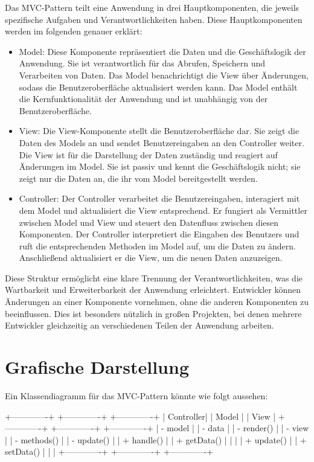 Das MVC-Pattern teilt eine Anwendung in drei Hauptkomponenten, die jeweils spezifische Aufgaben und Verantwortlichkeiten haben. Diese Hauptkomponenten werden im folgenden genauer erklärt:
\begin{itemize}

\item Model: Diese Komponente repräsentiert die Daten und die Geschäftslogik der Anwendung. Sie ist verantwortlich für das Abrufen, Speichern und Verarbeiten von Daten. Das Model benachrichtigt die View über Änderungen, sodass die Benutzeroberfläche aktualisiert werden kann. Das Model enthält die Kernfunktionalität der Anwendung und ist unabhängig von der Benutzeroberfläche.

\item View: Die View-Komponente stellt die Benutzeroberfläche dar. Sie zeigt die Daten des Models an und sendet Benutzereingaben an den Controller weiter. Die View ist für die Darstellung der Daten zuständig und reagiert auf Änderungen im Model. Sie ist passiv und kennt die Geschäftslogik nicht; sie zeigt nur die Daten an, die ihr vom Model bereitgestellt werden.

\item Controller: Der Controller verarbeitet die Benutzereingaben, interagiert mit dem Model und aktualisiert die View entsprechend. Er fungiert als Vermittler zwischen Model und View und steuert den Datenfluss zwischen diesen Komponenten. Der Controller interpretiert die Eingaben des Benutzers und ruft die entsprechenden Methoden im Model auf, um die Daten zu ändern. Anschließend aktualisiert er die View, um die neuen Daten anzuzeigen.

\end{itemize}
Diese Struktur ermöglicht eine klare Trennung der Verantwortlichkeiten, was die Wartbarkeit und Erweiterbarkeit der Anwendung erleichtert. Entwickler können Änderungen an einer Komponente vornehmen, ohne die anderen Komponenten zu beeinflussen. Dies ist besonders nützlich in großen Projekten, bei denen mehrere Entwickler gleichzeitig an verschiedenen Teilen der Anwendung arbeiten.

\section{Grafische Darstellung}

Ein Klassendiagramm für das MVC-Pattern könnte wie folgt aussehen:

+-------------+       +-------------+       +-------------+
|   Controller|       |     Model   |       |     View    |
+-------------+       +-------------+       +-------------+
| - model     |       | - data      |       | - render()  |
| - view      |       | - methods() |       | - update()  |
| + handle()  |       | + getData() |       |             |
| + update()  |       | + setData() |       |             |
+-------------+       +-------------+       +-------------+

